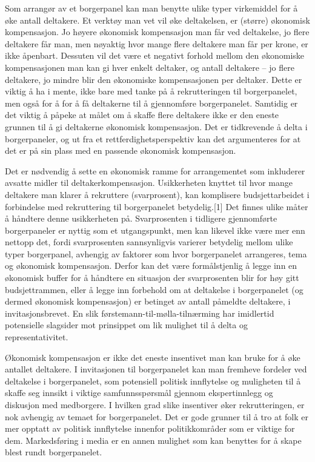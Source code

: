 \documentclass[
  12pt,
  a4paper, 12pt]{article}
\begin{document}
Som arrangør av et borgerpanel kan man benytte ulike typer virkemiddel for å øke antall deltakere. Et verktøy man vet vil øke deltakelsen, er (større) økonomisk kompensasjon. Jo høyere økonomisk kompensasjon man får ved deltakelse, jo flere deltakere får man, men nøyaktig hvor mange flere deltakere man får per krone, er ikke åpenbart. Dessuten vil det være et negativt forhold mellom den økonomiske kompensasjonen man kan gi hver enkelt deltaker, og antall deltakere -- jo flere deltakere, jo mindre blir den økonomiske kompensasjonen per deltaker. Dette er viktig å ha i mente, ikke bare med tanke på å rekrutteringen til borgerpanelet, men også for å for å få deltakerne til å gjennomføre borgerpanelet. Samtidig er det viktig å påpeke at målet om å skaffe flere deltakere ikke er den eneste grunnen til å gi deltakerne økonomisk kompensasjon. Det er tidkrevende å delta i borgerpaneler, og ut fra et rettferdighetsperspektiv kan det argumenteres for at det er på sin plass med en passende økonomisk kompensasjon.

Det er nødvendig å sette en økonomisk ramme for arrangementet som inkluderer avsatte midler til deltakerkompensasjon. Usikkerheten knyttet til hvor mange deltakere man klarer å rekruttere (svarprosent), kan komplisere budsjettarbeidet i forbindelse med rekruttering til borgerpanelet betydelig.{[}1{]} Det finnes ulike måter å håndtere denne usikkerheten på. Svarprosenten i tidligere gjennomførte borgerpaneler er nyttig som et utgangspunkt, men kan likevel ikke være mer enn nettopp det, fordi svarprosenten sannsynligvis varierer betydelig mellom ulike typer borgerpanel, avhengig av faktorer som hvor borgerpanelet arrangeres, tema og økonomisk kompensasjon. Derfor kan det være formålstjenlig å legge inn en økonomisk buffer for å håndtere en situasjon der svarprosenten blir for høy gitt budsjettrammen, eller å legge inn forbehold om at deltakelse i borgerpanelet (og dermed økonomisk kompensasjon) er betinget av antall påmeldte deltakere, i invitasjonsbrevet. En slik førstemann-til-mølla-tilnærming har imidlertid potensielle slagsider mot prinsippet om lik mulighet til å delta og representativitet.

Økonomisk kompensasjon er ikke det eneste insentivet man kan bruke for å øke antallet deltakere. I invitasjonen til borgerpanelet kan man fremheve fordeler ved deltakelse i borgerpanelet, som potensiell politisk innflytelse og muligheten til å skaffe seg innsikt i viktige samfunnsspørsmål gjennom ekspertinnlegg og diskusjon med medborgere. I hvilken grad slike insentiver øker rekrutteringen, er nok avhengig av temaet for borgerpanelet. Det er gode grunner til å tro at folk er mer opptatt av politisk innflytelse innenfor politikkområder som er viktige for dem. Markedsføring i media er en annen mulighet som kan benyttes for å skape blest rundt borgerpanelet.
\end{document}
